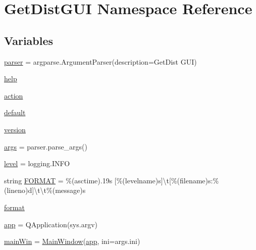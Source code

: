 \hypertarget{namespaceGetDistGUI}{}\section{Get\+Dist\+G\+UI Namespace Reference}
\label{namespaceGetDistGUI}
\subsection*{Variables}
\begin{DoxyCompactItemize}
\item 
\mbox{\hyperlink{namespaceGetDistGUI_af010defb28ed4e536d6ca1f71f39b66c}{parser}} = argparse.\+Argument\+Parser(description=\textquotesingle{}Get\+Dist G\+UI\textquotesingle{})
\item 
\mbox{\hyperlink{namespaceGetDistGUI_af3de335871b386773f8c493303689f47}{help}}
\item 
\mbox{\hyperlink{namespaceGetDistGUI_a4aea2e8a06199e38add180ddc17b287d}{action}}
\item 
\mbox{\hyperlink{namespaceGetDistGUI_a95e404c1cf8ba5c3f272edb0ded6d69e}{default}}
\item 
\mbox{\hyperlink{namespaceGetDistGUI_ad04559f89d673f1cbb0a67969d4c817a}{version}}
\item 
\mbox{\hyperlink{namespaceGetDistGUI_a30b4cfdddef98996cadbef20e7511deb}{args}} = parser.\+parse\+\_\+args()
\item 
\mbox{\hyperlink{namespaceGetDistGUI_a5a2e92ed482e68ec0d85d0a47837099c}{level}} = logging.\+I\+N\+FO
\item 
string \mbox{\hyperlink{namespaceGetDistGUI_a6ad5f28ce622d8bcf880c544eb0ecf44}{F\+O\+R\+M\+AT}} = \textquotesingle{}\%(asctime).\+19s \mbox{[}\%(levelname)s\mbox{]}\textbackslash{}t\mbox{[}\%(filename)s\+:\%(lineno)d\mbox{]}\textbackslash{}t\textbackslash{}t\%(message)s\textquotesingle{}
\item 
\mbox{\hyperlink{namespaceGetDistGUI_a8b6dc3be651ddcf14a58fc66f644fa3a}{format}}
\item 
\mbox{\hyperlink{namespaceGetDistGUI_a27a0f582f11b160e920880ef9c3b27bb}{app}} = Q\+Application(sys.\+argv)
\item 
\mbox{\hyperlink{namespaceGetDistGUI_a8f2089fb8420a7142ea5f2e06f72de50}{main\+Win}} = \mbox{\hyperlink{classgetdist_1_1gui_1_1mainwindow_1_1MainWindow}{Main\+Window}}(\mbox{\hyperlink{namespaceGetDistGUI_a27a0f582f11b160e920880ef9c3b27bb}{app}}, ini=args.\+ini)
\end{DoxyCompactItemize}


